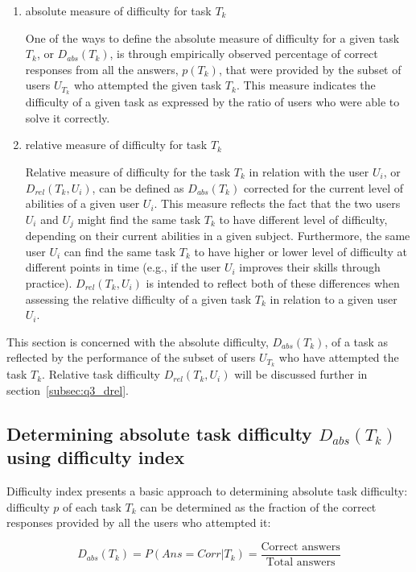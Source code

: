 \begin{enumerate}
    \item absolute measure of difficulty for task $T_k$

    One of the ways to define the absolute measure of difficulty for a given task $T_k$, or $D_{abs}(T_k)$, is through empirically observed percentage of correct responses from all the answers, $p(T_k)$, that were provided by the subset of users $U_{T_k}$ who attempted the given task $T_k$.
    This measure indicates the difficulty of a given task as expressed by the ratio of users who were able to solve it correctly.

    \item relative measure of difficulty for task $T_k$

    Relative measure of difficulty for the task $T_k$ in relation with the user $U_i$, or $D_{rel}(T_k, U_i)$, can be defined as $D_{abs}(T_k)$ corrected for the current level of abilities of a given user $U_i$.
    This measure reflects the fact that the two users $U_i$ and $U_j$ might find the same task $T_k$ to have different level of difficulty, depending on their current abilities in a given subject.
    Furthermore, the same user $U_i$ can find the same task $T_k$ to have higher or lower level of difficulty at different points in time (e.g., if the user $U_i$ improves their skills through practice).
    $D_{rel}(T_k, U_i)$ is intended to reflect both of these differences when assessing the relative difficulty of a given task $T_k$ in relation to a given user $U_i$.
\end{enumerate}

This section is concerned with the absolute difficulty, $D_{abs}(T_k)$, of a task as reflected by the performance of the subset of users $U_{T_k}$ who have attempted the task $T_k$.
Relative task difficulty $D_{rel}(T_k, U_i)$ will be discussed further in section~\ref{subsec:q3_drel}.

\subsection{Determining absolute task difficulty $D_{abs}(T_k)$ using difficulty index} \label{subsec:q1_difficulty_index}

Difficulty index presents a basic approach to determining absolute task difficulty: difficulty $p$ of each task $T_k$ can be determined as the fraction of the correct responses provided by all the users who attempted it:

\begin{equation} \label{eq:dabs}
    \label{eq:task_difficulty}
    D_{abs}(T_k) = P(Ans=Corr|T_k) = \frac{\text{Correct answers}} {\text{Total answers}}
\end{equation}

